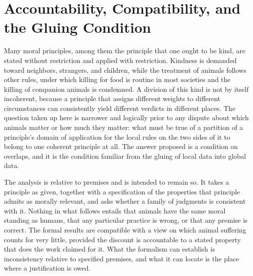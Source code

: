 \documentclass[11pt]{article}
\theoremstyle{definition}
\theoremstyle{plain}
\theoremstyle{definition}
\begin{document}
\section{Accountability, Compatibility, and the Gluing Condition}

Many moral principles, among them the principle that one ought to be kind, are stated without restriction and applied with restriction. Kindness is demanded toward neighbors, strangers, and children, while the treatment of animals follows other rules, under which killing for food is routine in most societies and the killing of companion animals is condemned. A division of this kind is not by itself incoherent, because a principle that assigns different weights to different circumstances can consistently yield different verdicts in different places. The question taken up here is narrower and logically prior to any dispute about which animals matter or how much they matter: what must be true of a partition of a principle's domain of application for the local rules on the two sides of it to belong to one coherent principle at all. The answer proposed is a condition on overlaps, and it is the condition familiar from the gluing of local data into global data.

The analysis is relative to premises and is intended to remain so. It takes a principle as given, together with a specification of the properties that principle admits as morally relevant, and asks whether a family of judgments is consistent with it. Nothing in what follows entails that animals have the same moral standing as humans, that any particular practice is wrong, or that any premise is correct. The formal results are compatible with a view on which animal suffering counts for very little, provided the discount is accountable to a stated property that does the work claimed for it. What the formalism can establish is inconsistency relative to specified premises, and what it can locate is the place where a justification is owed.
\end{document}
